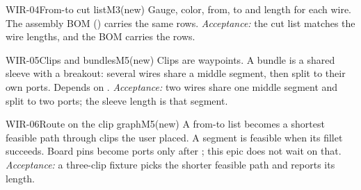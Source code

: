 \begin{epic}{WIR-04}{From-to cut list}{M3}{\stTodo}{(new)}
Gauge, color, from, to and length for each wire. The assembly BOM () carries the same rows.
\emph{Acceptance:} the cut list matches the wire lengths, and the BOM carries the rows.
\end{epic}

\begin{epic}{WIR-05}{Clips and bundles}{M5}{\stTodo}{(new)}
Clips are waypoints. A bundle is a shared sleeve with a breakout: several wires share a middle segment,
then split to their own ports. Depends on .
\emph{Acceptance:} two wires share one middle segment and split to two ports; the sleeve length is that
segment.
\end{epic}

\begin{epic}{WIR-06}{Route on the clip graph}{M5}{\stTodo}{(new)}
A from-to list becomes a shortest feasible path through clips the user placed. A segment is feasible when
its fillet succeeds. Board pins become ports only after ; this epic does not wait on that.
\emph{Acceptance:} a three-clip fixture picks the shorter feasible path and reports its length.
\end{epic}
